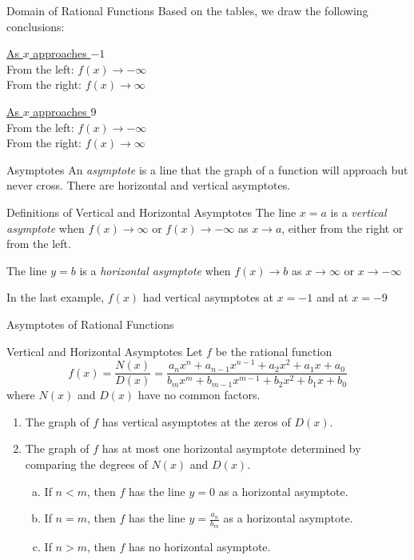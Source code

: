 \documentclass[t]{beamer}
\begin{document}
	\begin{frame}{Domain of Rational Functions}
		Based on the tables, we draw the following conclusions:
		
		\underline{As $x$ approaches $-1$} \pause \\
		From the left: $f(x) \to -\infty$ \\
		From the right: $f(x) \to \infty$ \pause
		
		\underline{As $x$ approaches $9$} \pause \\
		From the left: $f(x) \to -\infty$ \\ \pause
		From the right: $f(x) \to \infty$ 
	\end{frame}
	
	\begin{frame}{Asymptotes}
		An \textit{asymptote} is a line that the graph of a function will approach but never cross. There are horizontal and vertical asymptotes. \pause
		
		\begin{block}{Definitions of Vertical and Horizontal Asymptotes}
			The line $x = a$ is a \textit{vertical asymptote} when $f(x) \to \infty$ or $f(x) \to -\infty$ as $x \to a$, either from the right or from the left. \vspace{12pt}
			
			The line $y = b$ is a \textit{horizontal asymptote} when $f(x) \to b$ as $x \to \infty$ or $x \to -\infty$
		\end{block} \pause
	
		In the last example, $f(x)$ had vertical asymptotes at $x = -1$ and at $x = -9$
	\end{frame}

	\begin{frame}{Asymptotes of Rational Functions}
		\begin{block}{Vertical and Horizontal Asymptotes}
			Let $f$ be the rational function \vspace{-8pt} $$f(x) = \dfrac{N(x)}{D(x)} = \dfrac{a_nx^n + a_{n-1}x^{n-1} + a_2x^2 + a_1x + a_0}{b_mx^m + b_{m-1}x^{m-1} + b_2x^2 + b_1x + b_0}$$ \vspace{-8pt} where $N(x)$ and $D(x)$ have no common factors. \vspace{8pt} \pause
			\begin{enumerate}[1)]
				\item The graph of $f$ has vertical asymptotes at the zeros of $D(x)$. \pause
				\item The graph of $f$ has at most one horizontal asymptote determined by comparing the degrees of $N(x)$ and $D(x)$. \begin{enumerate}[(a)]
					\item If $n < m$, then $f$ has the line $y = 0$ as a horizontal asymptote. \pause
					\item If $n = m$, then $f$ has the line $y = \frac{a_n}{b_m}$ as a horizontal asymptote. \pause
					\item If $n > m$, then $f$ has no horizontal asymptote.
				\end{enumerate}
			\end{enumerate}
		\end{block}
	\end{frame}
\end{document}
